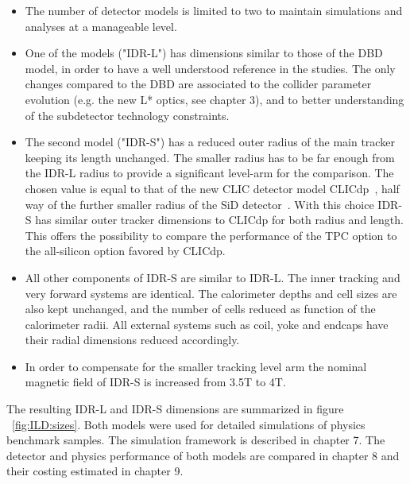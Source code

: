 \begin{itemize}
    
\item The number of detector models is limited to two to maintain simulations and analyses at a manageable level.

\item One of the models ("IDR-L") has dimensions similar to those of the DBD model, in order to have a well understood reference in the studies. The only changes compared to the DBD are associated to the collider parameter evolution (e.g. the new L* optics, see chapter 3), and to better understanding of the subdetector technology constraints.  

\item The second model ("IDR-S") has a reduced outer radius of the main tracker keeping its length unchanged. The smaller radius has to be far enough from the IDR-L radius to provide a significant level-arm for the comparison. The chosen value is equal to that of the new CLIC detector model CLICdp~\cite{Arominski:2018uuz}, half way of the further smaller radius of the SiD detector~\cite{ild:bib:ILDDBD}. With this choice IDR-S has similar outer tracker dimensions to CLICdp for both radius and length. This offers the possibility to compare the performance of the TPC option to the all-silicon option favored by CLICdp. 

\item All other components of IDR-S are similar to IDR-L. The inner tracking and very forward systems are identical. The calorimeter depths and cell sizes are also kept unchanged, and the number of cells reduced as function of the calorimeter radii. All external systems such as coil, yoke and endcaps have their radial dimensions reduced accordingly.

\item In order to compensate for the smaller tracking level arm the nominal magnetic field of IDR-S is increased from 3.5T to 4T.

\end{itemize}

The resulting IDR-L and IDR-S dimensions are summarized in figure ~\ref{fig:ILD:sizes}. Both models were used for detailed simulations of physics benchmark samples. The simulation framework is described in chapter 7. The detector and physics performance of both models are compared in chapter 8 and their costing estimated in chapter 9.

